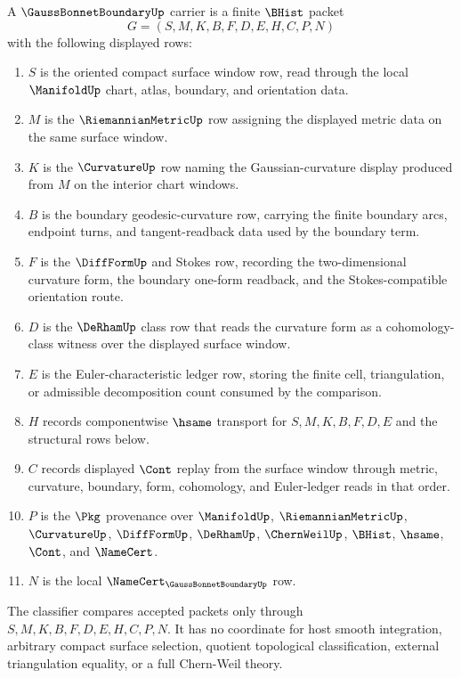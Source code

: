 \begin{definition}
\label{def:gauss-bonnet-boundary-carrier}
A $\GaussBonnetBoundaryUp$ carrier is a finite $\BHist$ packet
$$
G=(S,M,K,B,F,D,E,H,C,P,N)
$$
with the following displayed rows:
\begin{enumerate}
\item $S$ is the oriented compact surface window row, read through the local $\ManifoldUp$ chart, atlas, boundary, and orientation data.
\item $M$ is the $\RiemannianMetricUp$ row assigning the displayed metric data on the same surface window.
\item $K$ is the $\CurvatureUp$ row naming the Gaussian-curvature display produced from $M$ on the interior chart windows.
\item $B$ is the boundary geodesic-curvature row, carrying the finite boundary arcs, endpoint turns, and tangent-readback data used by the boundary term.
\item $F$ is the $\DiffFormUp$ and Stokes row, recording the two-dimensional curvature form, the boundary one-form readback, and the Stokes-compatible orientation route.
\item $D$ is the $\DeRhamUp$ class row that reads the curvature form as a cohomology-class witness over the displayed surface window.
\item $E$ is the Euler-characteristic ledger row, storing the finite cell, triangulation, or admissible decomposition count consumed by the comparison.
\item $H$ records componentwise $\hsame$ transport for $S,M,K,B,F,D,E$ and the structural rows below.
\item $C$ records displayed $\Cont$ replay from the surface window through metric, curvature, boundary, form, cohomology, and Euler-ledger reads in that order.
\item $P$ is the $\Pkg$ provenance over $\ManifoldUp$, $\RiemannianMetricUp$, $\CurvatureUp$, $\DiffFormUp$, $\DeRhamUp$, $\ChernWeilUp$, $\BHist$, $\hsame$, $\Cont$, and $\NameCert$.
\item $N$ is the local $\NameCert_{\GaussBonnetBoundaryUp}$ row.
\end{enumerate}
The classifier compares accepted packets only through $S,M,K,B,F,D,E,H,C,P,N$. It has no coordinate for host smooth integration, arbitrary compact surface selection, quotient topological classification, external triangulation equality, or a full Chern-Weil theory.
\end{definition}

